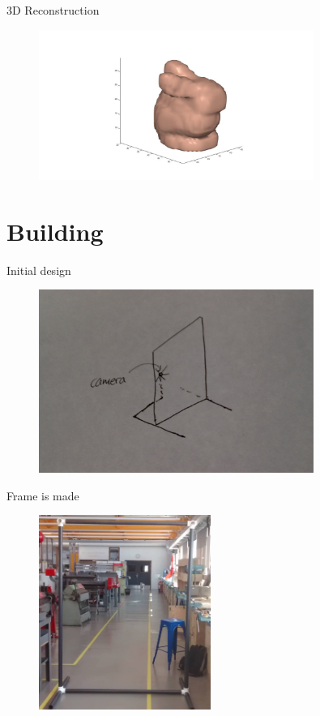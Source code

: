 \documentclass{beamer}
\begin{document}
\begin{frame}{3D Reconstruction}
    \begin{figure}[H]
      \centering
        \includegraphics[width=0.8\textwidth]{rabit_surface_1.jpg}
      \label{fig:f2}
    \end{figure}
\end{frame}

\section{Building}
\begin{frame}{Initial design}
    \begin{figure}[H]
      \centering
        \includegraphics[width=0.8\textwidth]{new_setup.jpg}
      \label{fig:f2}
    \end{figure}
\end{frame}

\begin{frame}{Frame is made}
    \begin{figure}[H]
      \centering
        \includegraphics[width=0.5\textwidth]{skeleton.jpg}
      \label{fig:f2}
    \end{figure}
\end{frame}
\end{document}
